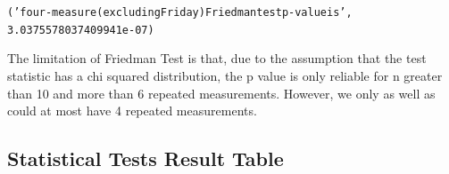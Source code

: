 \documentclass[letterpaper,10pt,english]{/Users/edwsurewin/anaconda/lib/python2.7/site-packages/sphinx/texinputs/sphinxhowto}
\newenvironment{InvisibleVerbatim}
        {\begin{mdframed}[leftmargin=0.1\linewidth,innerleftmargin=3pt,innerrightmargin=3pt, userdefinedwidth=1\linewidth, linewidth=0pt, linecolor=white, usetwoside=false]}
        {\end{mdframed}}
\begin{document}
    

        
        

            
                \begin{InvisibleVerbatim}
                \vspace{-0.5\baselineskip}
\begin{alltt}('four-measure (excluding Friday) Friedman test p-value is',
3.0375578037409941e-07)
\end{alltt}

            \end{InvisibleVerbatim}
            
        
    
The limitation of Friedman Test is that, due to the assumption that the
test statistic has a chi squared distribution, the p value is only
reliable for n greater than 10 and more than 6 repeated measurements.
However, we only as well as could at most have 4 repeated measurements.\subsection{Statistical Tests Result
Table}\label{statistical-tests-result-table}

\iffalse

\end{document}
